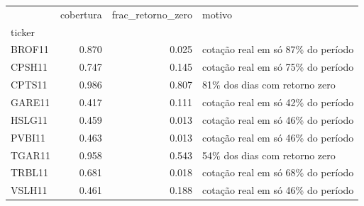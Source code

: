 \begin{tabular}{lrrl}
\toprule
 & cobertura & frac\_retorno\_zero & motivo \\
ticker &  &  &  \\
\midrule
BROF11 & 0.870 & 0.025 & cotação real em só 87\% do período \\
CPSH11 & 0.747 & 0.145 & cotação real em só 75\% do período \\
CPTS11 & 0.986 & 0.807 & 81\% dos dias com retorno zero \\
GARE11 & 0.417 & 0.111 & cotação real em só 42\% do período \\
HSLG11 & 0.459 & 0.013 & cotação real em só 46\% do período \\
PVBI11 & 0.463 & 0.013 & cotação real em só 46\% do período \\
TGAR11 & 0.958 & 0.543 & 54\% dos dias com retorno zero \\
TRBL11 & 0.681 & 0.018 & cotação real em só 68\% do período \\
VSLH11 & 0.461 & 0.188 & cotação real em só 46\% do período \\
\bottomrule
\end{tabular}
